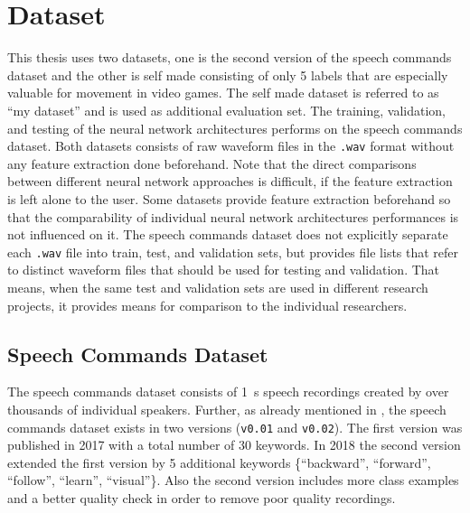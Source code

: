 
\section{Dataset}\label{sec:exp_dataset}
This thesis uses two datasets, one is the second version of the speech commands dataset \cite{Warden2018} and the other is self made consisting of only 5 labels that are especially valuable for movement in video games.
The self made dataset is referred to as \enquote{my dataset} and is used as additional evaluation set.
The training, validation, and testing of the neural network architectures performs on the speech commands dataset.
Both datasets consists of raw waveform files in the \texttt{.wav} format without any feature extraction done beforehand.
Note that the direct comparisons between different neural network approaches is difficult, if the feature extraction is left alone to the user.
Some datasets provide feature extraction beforehand so that the comparability of individual neural network architectures performances is not influenced on it.
The speech commands dataset does not explicitly separate each \texttt{.wav} file into train, test, and validation sets, but provides file lists that refer to distinct waveform files that should be used for testing and validation. 
That means, when the same test and validation sets are used in different research projects, it provides means for comparison to the individual researchers.



\subsection{Speech Commands Dataset}\label{sec:exp_dataset_speech_cmd}
The speech commands dataset \cite{Warden2018} consists of \SI{1}{\second} speech recordings created by over thousands of individual speakers.
Further, as already mentioned in , the speech commands dataset exists in two versions (\texttt{v0.01} and \texttt{v0.02}).
The first version was published in 2017 with a total number of 30 keywords.
In 2018 the second version extended the first version by 5 additional keywords \{\enquote{backward}, \enquote{forward}, \enquote{follow}, \enquote{learn}, \enquote{visual}\}.
Also the second version includes more class examples and a better quality check in order to remove poor quality recordings.

